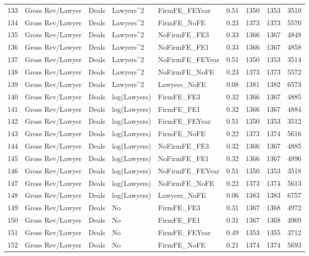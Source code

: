 \documentclass{article}
\begin{document}
\begin{table}[H]
\begin{tabular}{rllllllll}
  133 & Gross Rev/Lawyer & Deals & Lawyers^2 & FirmFE\_FEYear & 0.51 & 1350 & 1353 & 3510 \\ 
  134 & Gross Rev/Lawyer & Deals & Lawyers^2 & FirmFE\_NoFE & 0.23 & 1373 & 1373 & 5570 \\ 
  135 & Gross Rev/Lawyer & Deals & Lawyers^2 & NoFirmFE\_FE3 & 0.33 & 1366 & 1367 & 4848 \\ 
  136 & Gross Rev/Lawyer & Deals & Lawyers^2 & NoFirmFE\_FE1 & 0.33 & 1366 & 1367 & 4858 \\ 
  137 & Gross Rev/Lawyer & Deals & Lawyers^2 & NoFirmFE\_FEYear & 0.51 & 1350 & 1353 & 3514 \\ 
  138 & Gross Rev/Lawyer & Deals & Lawyers^2 & NoFirmFE\_NoFE & 0.23 & 1373 & 1373 & 5572 \\ 
  139 & Gross Rev/Lawyer & Deals & Lawyers^2 & Lawyers\_NoFE & 0.08 & 1381 & 1382 & 6573 \\ 
  140 & Gross Rev/Lawyer & Deals & log(Lawyers) & FirmFE\_FE3 & 0.32 & 1366 & 1367 & 4885 \\ 
  141 & Gross Rev/Lawyer & Deals & log(Lawyers) & FirmFE\_FE1 & 0.32 & 1366 & 1367 & 4884 \\ 
  142 & Gross Rev/Lawyer & Deals & log(Lawyers) & FirmFE\_FEYear & 0.51 & 1350 & 1353 & 3512 \\ 
  143 & Gross Rev/Lawyer & Deals & log(Lawyers) & FirmFE\_NoFE & 0.22 & 1373 & 1374 & 5616 \\ 
  144 & Gross Rev/Lawyer & Deals & log(Lawyers) & NoFirmFE\_FE3 & 0.32 & 1366 & 1367 & 4885 \\ 
  145 & Gross Rev/Lawyer & Deals & log(Lawyers) & NoFirmFE\_FE1 & 0.32 & 1366 & 1367 & 4896 \\ 
  146 & Gross Rev/Lawyer & Deals & log(Lawyers) & NoFirmFE\_FEYear & 0.51 & 1350 & 1353 & 3518 \\ 
  147 & Gross Rev/Lawyer & Deals & log(Lawyers) & NoFirmFE\_NoFE & 0.22 & 1373 & 1374 & 5613 \\ 
  148 & Gross Rev/Lawyer & Deals & log(Lawyers) & Lawyers\_NoFE & 0.06 & 1383 & 1383 & 6757 \\ 
  149 & Gross Rev/Lawyer & Deals & No & FirmFE\_FE3 & 0.31 & 1367 & 1368 & 4972 \\ 
  150 & Gross Rev/Lawyer & Deals & No & FirmFE\_FE1 & 0.31 & 1367 & 1368 & 4969 \\ 
  151 & Gross Rev/Lawyer & Deals & No & FirmFE\_FEYear & 0.49 & 1353 & 1355 & 3712 \\ 
  152 & Gross Rev/Lawyer & Deals & No & FirmFE\_NoFE & 0.21 & 1374 & 1374 & 5693 \\ 

\end{tabular}
\end{table}
\end{document}
